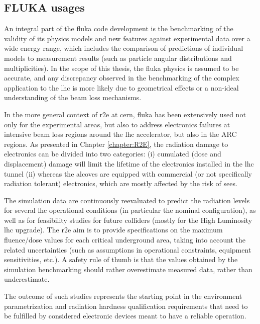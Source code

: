 \documentclass[encoding=utf8,british]{tumphthesis}
\begin{document}
\subsection{FLUKA usages}

An integral part of the \acrshort{fluka} code development is the benchmarking of the validity of its physics models and new features against experimental data over a wide energy range, which includes the comparison of predictions of individual models to measurement results (such as particle angular distributions and multiplicities). In the scope of this thesis, the \acrshort{fluka} physics is assumed to be accurate, and any discrepancy observed in the benchmarking of the complex application to the \acrshort{lhc} is more likely due to geometrical effects or a non-ideal understanding of the beam loss mechanisms.

In the more general context of \acrshort{r2e} at \acrshort{cern}, \acrshort{fluka} has been extensively used not only for the experimental areas, but also to address electronics failures at intensive beam loss regions around the \acrshort{lhc} accelerator, but also in the ARC regions. As presented in Chapter \ref{chapter:R2E}, the radiation damage to electronics can be divided into two categories: (i) cumulated (dose and displacement) damage will limit the lifetime of the electronics installed in the \acrshort{lhc} tunnel (ii) whereas the alcoves are equipped with commercial (or not specifically radiation tolerant) electronics, which are mostly affected by the risk of \acrshort{see}s.

The simulation data are continuously reevaluated to predict the radiation levels for several \acrshort{lhc} operational conditions (in particular the nominal configuration), as well as for feasibility studies for future colliders (mostly for the High Luminosity \acrshort{lhc} upgrade). The \acrshort{r2e} aim is to provide specifications on the maximum fluence/dose values for each critical underground area, taking into account the related uncertainties (such as assumptions in operational constraints, equipment sensitivities,  etc.). A safety rule of thumb is that the values obtained by the simulation benchmarking should rather overestimate measured data, rather than underestimate. 

The outcome of such studies represents the starting point in the environment parametrization and radiation hardness qualification requirements that need to be fulfilled by considered electronic devices meant to have a reliable operation.
\end{document}
